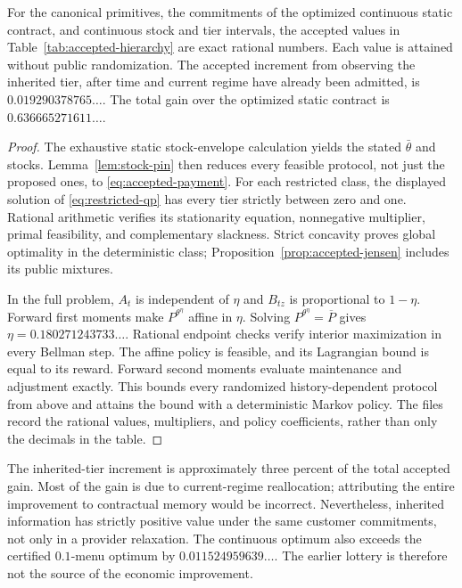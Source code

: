 \begin{theorem}\label{thm:accepted-hierarchy}
For the canonical primitives, the commitments of the optimized continuous static contract, and continuous stock and tier intervals, the accepted values in Table~\ref{tab:accepted-hierarchy} are exact rational numbers. Each value is attained without public randomization. The accepted increment from observing the inherited tier, after time and current regime have already been admitted, is $0.019290378765\ldots$. The total gain over the optimized static contract is $0.636665271611\ldots$.
\end{theorem}
\begin{proof}
The exhaustive static stock-envelope calculation yields the stated $\bar\theta$ and stocks. Lemma~\ref{lem:stock-pin} then reduces every feasible protocol, not just the proposed ones, to \eqref{eq:accepted-payment}. For each restricted class, the displayed solution of \eqref{eq:restricted-qp} has every tier strictly between zero and one. Rational arithmetic verifies its stationarity equation, nonnegative multiplier, primal feasibility, and complementary slackness. Strict concavity proves global optimality in the deterministic class; Proposition~\ref{prop:accepted-jensen} includes its public mixtures.

In the full problem, $A_t$ is independent of $\eta$ and $B_{tz}$ is proportional to $1-\eta$. Forward first moments make $P^{\theta^\eta}$ affine in $\eta$. Solving $P^{\theta^\eta}=\overline P$ gives $\eta=0.180271243733\ldots$. Rational endpoint checks verify interior maximization in every Bellman step. The affine policy is feasible, and its Lagrangian bound is equal to its reward. Forward second moments evaluate maintenance and adjustment exactly. This bounds every randomized history-dependent protocol from above and attains the bound with a deterministic Markov policy. The files record the rational values, multipliers, and policy coefficients, rather than only the decimals in the table.
\end{proof}

The inherited-tier increment is approximately three percent of the total accepted gain. Most of the gain is due to current-regime reallocation; attributing the entire improvement to contractual memory would be incorrect. Nevertheless, inherited information has strictly positive value under the same customer commitments, not only in a provider relaxation. The continuous optimum also exceeds the certified $0.1$-menu optimum by $0.011524959639\ldots$. The earlier lottery is therefore not the source of the economic improvement.

